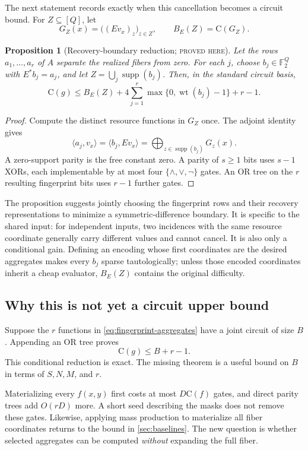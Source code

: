\documentclass[11pt]{article}
\newtheorem{proposition}[proposition]{Proposition}
\theoremstyle{definition}
\theoremstyle{remark}
\newcommand{\F}{\mathbb F}
\newcommand{\C}{\mathrm C}
\newcommand{\wt}{\operatorname{wt}}
\newcommand{\supp}{\operatorname{supp}}
\newcommand{\status}[1]{\textsc{#1}}
\begin{document}
The next statement records exactly when this cancellation becomes a circuit
bound.  For $Z\subseteq[Q]$, let
\[
  G_Z(x)=\bigl((Ev_x)_z\bigr)_{z\in Z},
  \qquad B_E(Z)=\C(G_Z).
\]

\begin{proposition}[Recovery-boundary reduction; \status{proved here}]
\label{prop:recovery-boundary}
Let the rows $a_1,\ldots,a_r$ of $A$ separate the realized fibers from zero.
For each $j$, choose $b_j\in\F_2^Q$ with $E^*b_j=a_j$, and let
$Z=\bigcup_j\supp(b_j)$.  Then, in the standard circuit basis,
\[
  \C(g)\le B_E(Z)
  +4\sum_{j=1}^r\max\{0,\wt(b_j)-1\}+r-1.
  \tag{4.9}\label{eq:recovery-boundary-bound}
\]
\end{proposition}

\begin{proof}
Compute the distinct resource functions in $G_Z$ once.  The adjoint identity
gives
\[
  \langle a_j,v_x\rangle
  =\langle b_j,Ev_x\rangle
  =\bigoplus_{z\in\supp(b_j)}G_z(x).
\]
A zero-support parity is the free constant zero.  A parity of $s\ge1$ bits
uses $s-1$ XORs, each implementable by at most four
$\{\wedge,\vee,\neg\}$ gates.  An OR tree on the $r$ resulting fingerprint
bits uses $r-1$ further gates.
\end{proof}

The proposition suggests jointly choosing the fingerprint rows and their
recovery representations to minimize a symmetric-difference boundary.  It is
specific to the shared input: for independent inputs, two incidences with the
same resource coordinate generally carry different values and cannot cancel.
It is also only a conditional gain.  Defining an encoding whose first
coordinates are the desired aggregates makes every $b_j$ sparse
tautologically; unless those encoded coordinates inherit a cheap evaluator,
$B_E(Z)$ contains the original difficulty.

\subsection{Why this is not yet a circuit upper bound}

Suppose the $r$ functions in \eqref{eq:fingerprint-aggregates} have a joint
circuit of size $B$.  Appending an OR tree proves
\[
  \C(g)\le B+r-1.
  \tag{4.10}\label{eq:aggregate-reduction}
\]
This conditional reduction is exact.  The missing theorem is a useful bound
on $B$ in terms of $S,N,M$, and $r$.

Materializing every $f(x,y)$ first costs at most $D\C(f)$ gates, and direct
parity trees add $O(rD)$ more.  A short seed describing the masks does not
remove these gates.  Likewise, applying mass production to materialize all
fiber coordinates returns to the bound in \cref{sec:baselines}.  The new
question is whether selected aggregates can be computed \emph{without}
expanding the full fiber.
\end{document}
